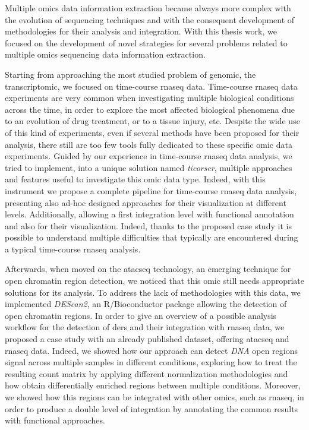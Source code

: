 Multiple omics data information extraction became always more complex with the evolution of sequencing techniques and with the consequent development of methodologies for their analysis and integration.
With this thesis work, we focused on the development of novel strategies for several problems related to multiple omics sequencing data information extraction.

Starting from approaching the most studied problem of genomic, the transcriptomic, we focused on time-course \gls{rnaseq} data.
Time-course \gls{rnaseq} data experiments are very common when investigating multiple biological conditions across the time, in order to explore the most affected biological phenomena due to an evolution of drug treatment, or to a tissue injury, etc.
Despite the wide use of this kind of experiments, even if several methods have been proposed for their analysis, there still are too few tools fully dedicated to these specific omic data experiments.
Guided by our experience in time-course \gls{rnaseq} data analysis, we tried to implement, into a unique solution named \textit{ticorser}, multiple approaches and features useful to investigate this omic data type.
Indeed, with this instrument we propose a complete pipeline for time-course \gls{rnaseq} data analysis, presenting also ad-hoc designed approaches for their visualization at different levels.
Additionally, allowing a first integration level with functional annotation and also for their visualization.
Indeed, thanks to the proposed case study it is possible to understand multiple difficulties that typically are encountered during a typical time-course \gls{rnaseq} analysis.

Afterwards, when moved on the \gls{atacseq} technology, an emerging technique for open chromatin region detection, we noticed that this omic still needs appropriate solutions for its analysis.
To address the lack of methodologies with this data, we implemented \textit{DEScan2}, an R/Bioconductor package allowing the detection of open chromatin regions.
In order to give an overview of a possible analysis workflow for the detection of \glspl{der} and their integration with \gls{rnaseq} data, we proposed a case study with an already published dataset, offering \gls{atacseq} and \gls{rnaseq} data.
Indeed, we showed how our approach can detect \textit{DNA} open regions signal across multiple samples in different conditions, exploring how to treat the resulting count matrix by applying different normalization methodologies and how obtain differentially enriched regions between multiple conditions.
Moreover, we showed how this regions can be integrated with other omics, such as \gls{rnaseq}, in order to produce a double level of integration by annotating the common results with functional approaches.

